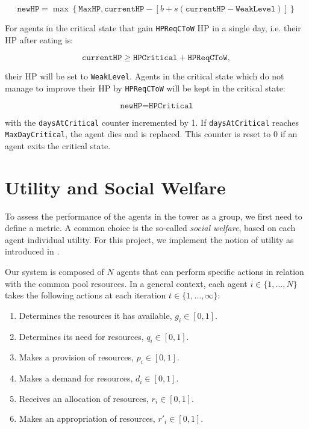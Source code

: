 \begin{equation}\label{hpDecay_bounded}
    \texttt{newHP} =\max\left\{\texttt{MaxHP}, \texttt{currentHP}-\left[b + s(\texttt{currentHP}-\texttt{WeakLevel})\right]\right\}
\end{equation}

For agents in the critical state that gain \texttt{HPReqCToW} HP in a single day, i.e. their HP after eating is:

\begin{equation}\label{HPReqCToW}
    \texttt{currentHP} \geq \texttt{HPCritical}+\texttt{HPReqCToW},
\end{equation}

their HP will be set to \texttt{WeakLevel}. Agents in the critical state which do not manage to improve their HP by \lstinline$HPReqCToW$ will be kept in the critical state:

\begin{equation}\label{hpDecay_critical_stay}
    \texttt{newHP} = \texttt{HPCritical}
\end{equation}

with the \texttt{daysAtCritical} counter incremented by 1. If \texttt{daysAtCritical} reaches \texttt{MaxDayCritical}, the agent dies and is replaced. This counter is reset to 0 if an agent exits the critical state.




\section{Utility and Social Welfare}\label{utility}

To assess the performance of the agents in the tower as a group, we first need to define a metric. A common choice is the so-called \emph{social welfare}, based on each agent individual utility. For this project, we implement the notion of utility as introduced in \cite{somasPitt}.

Our system is composed of $N$ agents that can perform specific actions in relation with the common pool resources. In a general context, each agent 
$i\in\{1, \ldots, N\}$ takes the following actions at each iteration $t\in\{1,\ldots,\infty\}$:

\begin{enumerate}
    \item Determines the resources it has available, $g_i \in [0,1]$.
    \item Determines its need for resources, $q_i \in [0,1]$.
    \item Makes a provision of resources, $p_i \in [0,1]$.
    \item Makes a demand for resources, $d_i \in [0,1]$.
    \item Receives an allocation of resources, $r_i \in [0,1]$.
    \item Makes an appropriation of resources, $r'_i \in [0,1]$.
\end{enumerate}

